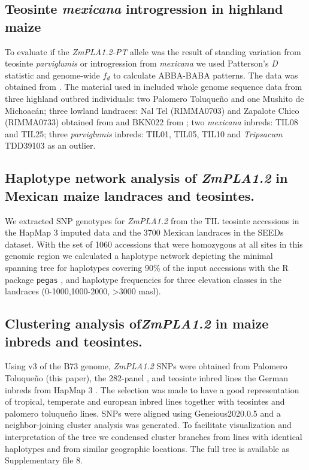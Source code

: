 \documentclass[9pt,twocolumn,twoside,lineno]{BioRxiv}
\def\code#1{\texttt{#1}}
\begin{document}
\subsection{Teosinte \textit{mexicana} introgression in highland maize}

To evaluate if the \textit{ZmPLA1.2-PT} allele was the result of standing variation from teosinte \textit{parviglumis} or introgression from \textit{mexicana} we used Patterson's \textit{D} statistic and genome-wide $f_{d}$ to calculate ABBA-BABA patterns. 
The data was obtained from \cite{Gonzalez-Segovia2019-jy}. 
The material used in \cite{Gonzalez-Segovia2019-jy} included whole genome sequence data from three highland outbred individuals: two Palomero Toluqueño and one Mushito de Michoacán; three lowland landraces: Nal Tel (RIMMA0703) and Zapalote Chico (RIMMA0733) obtained from \cite{Wang2017-bc} and  BKN022 from \cite{Bukowski2017-ng}; two \textit{mexicana} inbreds: TIL08 and TIL25; three \textit{parviglumis} inbreds: TIL01, TIL05, TIL10 and \textit{Tripsacum} TDD39103 \cite{Bukowski2017-ng} as an outlier. 

\subsection{Haplotype network analysis of \textit{ZmPLA1.2} in Mexican maize landraces and teosintes.}
We extracted SNP genotypes for \textit{ZmPLA1.2} from the TIL teosinte accessions in the HapMap 3 imputed data \cite{Bukowski2017-ng} and the 3700 Mexican landraces in the SEEDs dataset. 
With the set of 1060 accessions that were homozygous at all sites in this genomic region we calculated a haplotype network depicting the minimal spanning tree for haplotypes covering 90\% of the input accessions with the R package \code{pegas} \cite{paradis2010}, and haplotype frequencies for three elevation classes in the landraces (0-1000,1000-2000, >3000 masl).

\subsection{Clustering analysis of\textit{ZmPLA1.2} in maize inbreds and teosintes.}
Using v3 of the B73 genome, \textit{ZmPLA1.2} SNPs were obtained from Palomero Toluqueño (this paper), the 282-panel \cite{Flint-Garcia2005-hb},  and teosinte inbred lines the German inbreds from HapMap 3 \cite{Bukowski2017-ng}. 
The selection was made to have a good representation of tropical, temperate and european inbred lines together with teosintes and palomero toluqueño lines.
SNPs were aligned using Geneious2020.0.5 and a neighbor-joining cluster analysis was generated. 
To facilitate visualization and interpretation of the tree we condensed cluster branches from lines with identical haplotypes and from similar geographic locations. 
The full tree is available as Supplementary file 8. 
\end{document}
